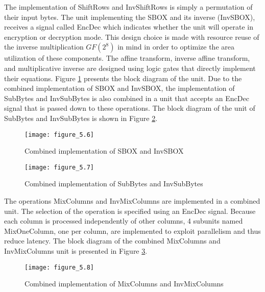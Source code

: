 The implementation of ShiftRows and InvShiftRows is simply a permutation of their input bytes. The unit implementing the SBOX and its inverse (InvSBOX), receives a signal called EncDec which indicates whether the unit will operate in encryption or decryption mode. This design choice is made with resource reuse of the inverse multiplication $GF(2^8)$ in mind in order to optimize the area utilization of these components. The affine transform, inverse affine transform, and multiplicative inverse are designed using logic gates that directly implement their equations. Figure \ref{fig:figure_5.6} presents the block diagram of the unit. Due to the combined implementation of SBOX and InvSBOX, the implementation of SubBytes and InvSubBytes is also combined in a unit that accepts an EncDec signal that is passed down to these operations. The block diagram of the unit of SubBytes and InvSubBytes is shown in Figure \ref{fig:figure_5.7}.

\begin{figure}[H]
\centering
\texttt{[image: figure\_5.6]}\\
\caption{ Combined implementation of SBOX and InvSBOX }
\label{fig:figure_5.6}
\end{figure}


\begin{figure}
\centering
\texttt{[image: figure\_5.7]}\\
\caption{ Combined implementation of SubBytes and InvSubBytes }
\label{fig:figure_5.7}
\end{figure}

The operations MixColumns and InvMixColumns are implemented in a combined unit. The selection of the operation is specified using an EncDec signal. Because each column is processed independently of other columns, 4 subunits named MixOneColumn, one per column, are implemented to exploit parallelism and thus reduce latency. The block diagram of the combined MixColumns and InvMixColumns unit is presented in Figure \ref{fig:figure_5.8}.

\begin{figure}
\centering
\texttt{[image: figure\_5.8]}\\
\caption{   Combined implementation of MixColumns and InvMixColumns}
\label{fig:figure_5.8}
\end{figure}

